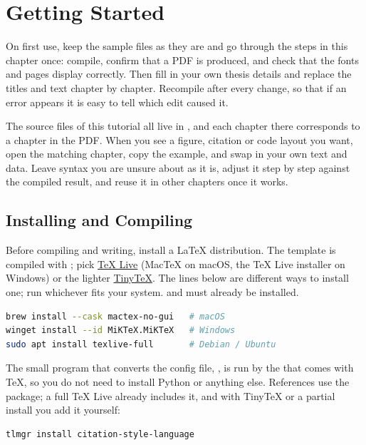 \chapter{Getting Started}\label{cha:start}

On first use, keep the sample files as they are and go through the steps in this chapter once: compile, confirm that a PDF is produced, and check that the fonts and pages display correctly. Then fill in your own thesis details and replace the titles and text chapter by chapter. Recompile after every change, so that if an error appears it is easy to tell which edit caused it.

The source files of this tutorial all live in , and each chapter there corresponds to a chapter in the PDF. When you see a figure, citation or code layout you want, open the matching chapter, copy the example, and swap in your own text and data. Leave syntax you are unsure about as it is, adjust it step by step against the compiled result, and reuse it in other chapters once it works.

\section{Installing and Compiling}

Before compiling and writing, install a \LaTeX{} distribution. The template is compiled with \XeLaTeX{}; pick \href{https://www.tug.org/texlive/}{TeX Live} (MacTeX on macOS, the TeX Live installer on Windows) or the lighter \href{https://yihui.org/tinytex/}{TinyTeX}. The lines below are different ways to install one; run whichever fits your system.  and  must already be installed.

\begin{lstlisting}[language=bash]
brew install --cask mactex-no-gui   # macOS
winget install --id MiKTeX.MiKTeX   # Windows
sudo apt install texlive-full       # Debian / Ubuntu
\end{lstlisting}

The small program that converts the config file, , is run by the  that comes with \TeX{}, so you do not need to install Python or anything else. References use the  package; a full \TeX{} Live already includes it, and with TinyTeX or a partial install you add it yourself:

\begin{lstlisting}[language=bash]
tlmgr install citation-style-language
\end{lstlisting}

